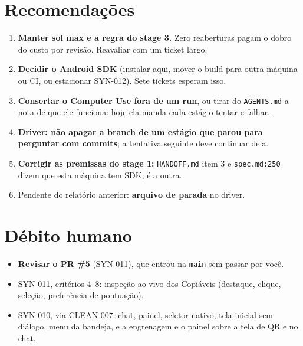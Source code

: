 \documentclass[11pt,a4paper]{article}
\begin{document}
\section{Recomendações}
\begin{enumerate}
  \item \textbf{Manter sol max e a regra do stage 3.} Zero reaberturas pagam o
        dobro do custo por revisão. Reavaliar com um ticket largo.
  \item \textbf{Decidir o Android SDK} (instalar aqui, mover o build para outra
        máquina ou CI, ou estacionar SYN-012). Sete tickets esperam isso.
  \item \textbf{Consertar o Computer Use fora de um run}, ou tirar do
        \texttt{AGENTS.md} a nota de que ele funciona: hoje ela manda cada
        estágio tentar e falhar.
  \item \textbf{Driver: não apagar a branch de um estágio que parou para
        perguntar com commits}; a tentativa seguinte deve continuar dela.
  \item \textbf{Corrigir as premissas do stage 1:} \texttt{HANDOFF.md} item 3
        e \texttt{spec.md:250} dizem que esta máquina tem SDK; é a outra.
  \item Pendente do relatório anterior: \textbf{arquivo de parada} no driver.
\end{enumerate}

\section{Débito humano}
\begin{itemize}
  \item \textbf{Revisar o PR \#5} (SYN-011), que entrou na \texttt{main} sem
        passar por você.
  \item SYN-011, critérios 4--8: inspeção ao vivo dos Copiáveis (destaque,
        clique, seleção, preferência de pontuação).
  \item SYN-010, via CLEAN-007: chat, painel, seletor nativo, tela inicial sem
        diálogo, menu da bandeja, e a engrenagem e o painel sobre a tela de QR
        e no chat.
\end{itemize}
\end{document}
